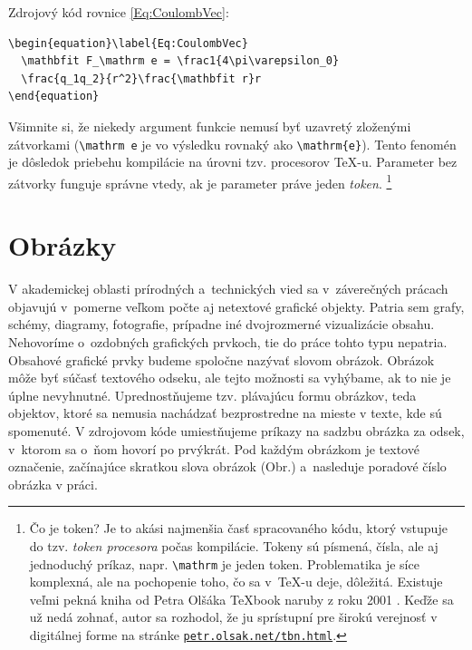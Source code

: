 Zdrojový kód rovnice \eqref{Eq:CoulombVec}:
\begin{verbatim}
\begin{equation}\label{Eq:CoulombVec}
  \mathbfit F_\mathrm e = \frac1{4\pi\varepsilon_0}
  \frac{q_1q_2}{r^2}\frac{\mathbfit r}r
\end{equation}
\end{verbatim}
Všimnite si, že niekedy argument funkcie nemusí byť
uzavretý zloženými zátvorkami (\verb|\mathrm e| je vo výsledku rovnaký ako \verb|\mathrm{e}|).
Tento fenomén je dôsledok priebehu kompilácie na úrovni tzv. procesorov \TeX-u.
Parameter bez zátvorky funguje správne vtedy,
ak je parameter práve jeden \emph{token}.%
\footnote{Čo je token? Je to akási najmenšia časť spracovaného
kódu, ktorý vstupuje do tzv. \emph{token procesora}
počas kompilácie.
Tokeny sú písmená, čísla, ale aj jednoduchý príkaz,
napr. \texttt{\textbackslash mathrm} je jeden token.
Problematika je síce komplexná, ale na pochopenie
toho, čo sa v~\TeX-u deje, dôležitá.
Existuje veľmi pekná kniha od Petra Olšáka \TeX book naruby z roku 2001 \cite{Olsak2001Texbook}.
Keďže sa už nedá zohnať, autor sa rozhodol, že ju sprístupní pre širokú verejnosť v digitálnej forme na stránke
\href{https://petr.olsak.net/tbn.html}{\texttt{petr.olsak.net/tbn.html}}.
}

\section{Obrázky}
V akademickej oblasti prírodných a~technických vied sa v~záverečných prácach
objavujú v~pomerne veľkom počte aj netextové grafické objekty. Patria sem grafy, schémy, diagramy, fotografie,
prípadne iné dvojrozmerné vizualizácie obsahu.
Nehovoríme o~ozdobných grafických prvkoch,
tie do práce tohto typu nepatria.
Obsahové grafické prvky budeme spoločne nazývať slovom obrázok.
Obrázok môže byť súčasť textového odseku,
ale tejto možnosti sa vyhýbame,
ak to nie je úplne nevyhnutné.
Uprednostňujeme tzv. plávajúcu formu obrázkov,
teda objektov, ktoré sa nemusia nachádzať bezprostredne
na mieste v texte, kde sú spomenuté.
V zdrojovom kóde umiestňujeme príkazy na sadzbu obrázka za odsek,
v~ktorom sa o~ňom hovorí po prvýkrát.
Pod každým obrázkom je textové označenie,
začínajúce skratkou slova obrázok (Obr.) a~nasleduje
poradové číslo obrázka v práci.

